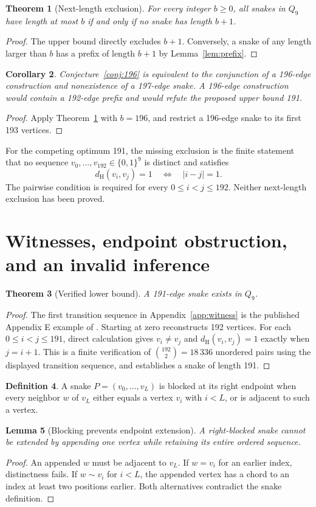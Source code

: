 \documentclass[11pt,a4paper]{article}
\newtheorem{theorem}{Theorem}[section]
\newtheorem{lemma}[theorem]{Lemma}
\newtheorem{corollary}[theorem]{Corollary}
\theoremstyle{definition}
\newtheorem{definition}[theorem]{Definition}
\theoremstyle{remark}
\newcommand{\Q}{Q}
\newcommand{\Ham}{d_{\mathrm H}}
\begin{document}
\begin{theorem}[Next-length exclusion]\label{thm:next}
For every integer $b\ge0$, all snakes in $\Q_9$ have length at most $b$ if and only if no snake has length $b+1$.
\end{theorem}
\begin{proof}
The upper bound directly excludes $b+1$. Conversely, a snake of any length larger than $b$ has a prefix of length $b+1$ by Lemma~\ref{lem:prefix}.
\end{proof}

\begin{corollary}
Conjecture~\ref{conj:196} is equivalent to the conjunction of a 196-edge construction and nonexistence of a 197-edge snake. A 196-edge construction would contain a 192-edge prefix and would refute the proposed upper bound 191.
\end{corollary}
\begin{proof}
Apply Theorem~\ref{thm:next} with $b=196$, and restrict a 196-edge snake to its first 193 vertices.
\end{proof}
For the competing optimum 191, the missing exclusion is the finite statement that no sequence $v_0,\ldots,v_{192}\in\{0,1\}^9$ is distinct and satisfies
\[
\Ham(v_i,v_j)=1\quad\Longleftrightarrow\quad |i-j|=1.
\]
The pairwise condition is required for every $0\le i<j\le192$. Neither next-length exclusion has been proved.

\section{Witnesses, endpoint obstruction, and an invalid inference}
\begin{theorem}[Verified lower bound]\label{thm:lower}
A 191-edge snake exists in $\Q_9$.
\end{theorem}
\begin{proof}
The first transition sequence in Appendix~\ref{app:witness} is the published Appendix E example of \cite{orland}. Starting at zero reconstructs 192 vertices. For each $0\le i<j\le191$, direct calculation gives $v_i\ne v_j$ and $\Ham(v_i,v_j)=1$ exactly when $j=i+1$. This is a finite verification of $\binom{192}{2}=18\,336$ unordered pairs using the displayed transition sequence, and establishes a snake of length 191.
\end{proof}

\begin{definition}
A snake $P=(v_0,\ldots,v_L)$ is blocked at its right endpoint when every neighbor $w$ of $v_L$ either equals a vertex $v_i$ with $i<L$, or is adjacent to such a vertex.
\end{definition}
\begin{lemma}[Blocking prevents endpoint extension]\label{lem:block}
A right-blocked snake cannot be extended by appending one vertex while retaining its entire ordered sequence.
\end{lemma}
\begin{proof}
An appended $w$ must be adjacent to $v_L$. If $w=v_i$ for an earlier index, distinctness fails. If $w\sim v_i$ for $i<L$, the appended vertex has a chord to an index at least two positions earlier. Both alternatives contradict the snake definition.
\end{proof}
\end{document}
